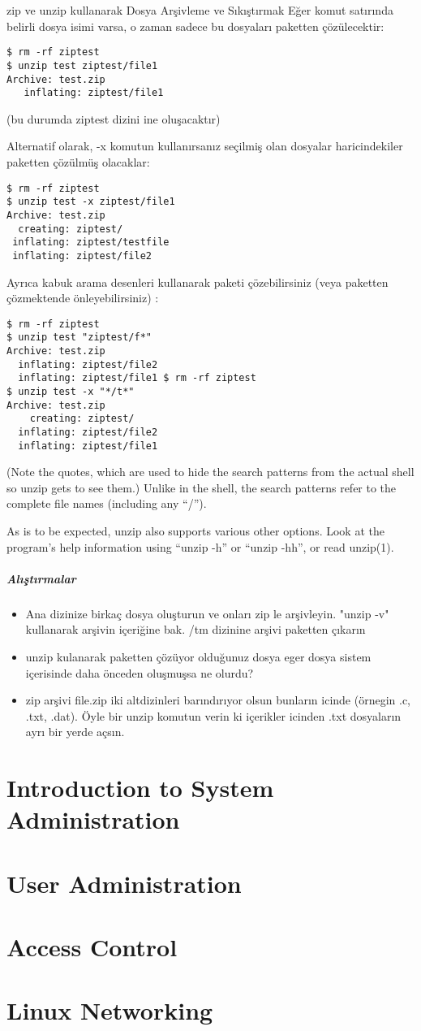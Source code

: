 \documentclass[10pt,a5paper]{book}
\begin{document}
\begin{section}{zip ve unzip kullanarak Dosya Arşivleme ve Sıkıştırmak}
Eğer komut satırında belirli dosya isimi varsa, o zaman sadece bu dosyaları paketten çözülecektir:
\begin{verbatim}
$ rm -rf ziptest
$ unzip test ziptest/file1 
Archive: test.zip
   inflating: ziptest/file1
\end{verbatim}
(bu durumda ziptest dizini ine oluşacaktır)

Alternatif olarak, -x komutun kullanırsanız seçilmiş olan dosyalar haricindekiler paketten çözülmüş olacaklar:
\begin{verbatim}
$ rm -rf ziptest
$ unzip test -x ziptest/file1 
Archive: test.zip
  creating: ziptest/ 
 inflating: ziptest/testfile
 inflating: ziptest/file2
\end{verbatim}
Ayrıca kabuk arama desenleri kullanarak paketi çözebilirsiniz (veya paketten çözmektende önleyebilirsiniz) :
\begin{verbatim}
$ rm -rf ziptest
$ unzip test "ziptest/f*" 
Archive: test.zip
  inflating: ziptest/file2
  inflating: ziptest/file1 $ rm -rf ziptest
$ unzip test -x "*/t*" 
Archive: test.zip
    creating: ziptest/ 
  inflating: ziptest/file2 
  inflating: ziptest/file1
\end{verbatim}

(Note the quotes, which are used to hide the search patterns from the actual shell so unzip gets to see them.) Unlike in the shell, the search patterns refer to the complete file names (including any “/”).

As is to be expected, unzip also supports various other options. Look at the
program’s help information using “unzip -h” or “unzip -hh”, or read unzip(1).

\paragraph{Alıştırmalar}{
\begin{itemize}
 \item Ana dizinize birkaç dosya oluşturun ve onları zip le arşivleyin. "unzip -v" kullanarak arşivin içeriğine bak. /tm dizinine arşivi paketten çıkarın
 \item unzip kulanarak paketten çözüyor olduğunuz dosya eger dosya sistem içerisinde daha önceden oluşmuşsa ne olurdu?
 \item zip arşivi file.zip iki altdizinleri barındırıyor olsun bunların icinde (örnegin .c, .txt, .dat). Öyle bir unzip komutun verin ki içerikler icinden .txt dosyaların ayrı bir yerde açsın.
\end{itemize}}
\end{section}






\chapter{Introduction to System Administration}
\chapter{User Administration}
\chapter{Access Control}
\chapter{Linux Networking}
\end{document}

